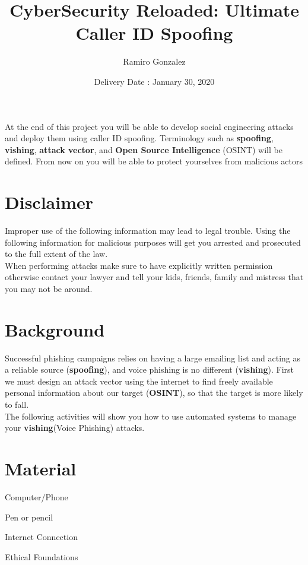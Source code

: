 \documentclass[12pt]{article}
\begin{document}
\title{CyberSecurity Reloaded: Ultimate Caller ID Spoofing}
\author{Ramiro Gonzalez}
\date{Delivery Date : January 30, 2020}

\maketitle


	At the end of this project you will be able to develop social engineering attacks and deploy them using caller ID spoofing. Terminology such as \textbf{spoofing}, \textbf{vishing}, \textbf{attack vector}, and \textbf{Open Source Intelligence} (OSINT) will be defined. From now on you will be able to protect yourselves from malicious actors 

\section*{Disclaimer}
Improper use of the following information may lead to legal trouble. Using the following information for malicious purposes will get you arrested and prosecuted to the full extent of the law.\\

When performing attacks make sure to have explicitly written permission otherwise contact your lawyer and tell your kids, friends, family and mistress that you may not be around.  
\section*{Background}
Successful phishing campaigns relies on having a large emailing list and acting as a reliable source (\textbf{spoofing}), and voice phishing is no different (\textbf{vishing}). First we must design an attack vector using the internet to find freely available personal information about our target (\textbf{OSINT}), so that the target is more likely to fall. \\

The following activities will show you how to use automated systems to manage your \textbf{vishing}(Voice Phishing) attacks. 
\section*{Material}
 \color{black}
\begin{todolist}
    \item Computer/Phone
    \item Pen or pencil
    \item Internet Connection
    \item Ethical Foundations
\end{todolist}
\end{document}
